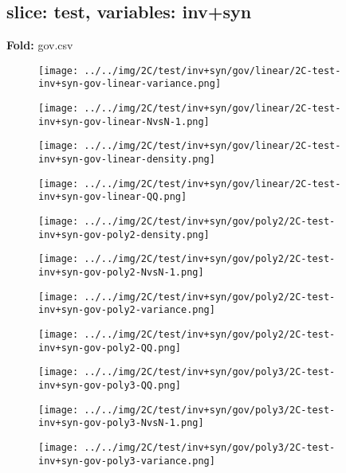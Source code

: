 \subsection{slice: test, variables: inv+syn}
\textbf{Fold:} gov.csv
\begin{figure}[H]
\centering	\texttt{[image: ../../img/2C/test/inv+syn/gov/linear/2C-test-inv+syn-gov-linear-variance.png]}
\end{figure}
\begin{figure}[H]
\centering	\texttt{[image: ../../img/2C/test/inv+syn/gov/linear/2C-test-inv+syn-gov-linear-NvsN-1.png]}
\end{figure}
\begin{figure}[H]
\centering	\texttt{[image: ../../img/2C/test/inv+syn/gov/linear/2C-test-inv+syn-gov-linear-density.png]}
\end{figure}
\begin{figure}[H]
\centering	\texttt{[image: ../../img/2C/test/inv+syn/gov/linear/2C-test-inv+syn-gov-linear-QQ.png]}
\end{figure}
\begin{figure}[H]
\centering	\texttt{[image: ../../img/2C/test/inv+syn/gov/poly2/2C-test-inv+syn-gov-poly2-density.png]}
\end{figure}
\begin{figure}[H]
\centering	\texttt{[image: ../../img/2C/test/inv+syn/gov/poly2/2C-test-inv+syn-gov-poly2-NvsN-1.png]}
\end{figure}
\begin{figure}[H]
\centering	\texttt{[image: ../../img/2C/test/inv+syn/gov/poly2/2C-test-inv+syn-gov-poly2-variance.png]}
\end{figure}
\begin{figure}[H]
\centering	\texttt{[image: ../../img/2C/test/inv+syn/gov/poly2/2C-test-inv+syn-gov-poly2-QQ.png]}
\end{figure}
\begin{figure}[H]
\centering	\texttt{[image: ../../img/2C/test/inv+syn/gov/poly3/2C-test-inv+syn-gov-poly3-QQ.png]}
\end{figure}
\begin{figure}[H]
\centering	\texttt{[image: ../../img/2C/test/inv+syn/gov/poly3/2C-test-inv+syn-gov-poly3-NvsN-1.png]}
\end{figure}
\begin{figure}[H]
\centering	\texttt{[image: ../../img/2C/test/inv+syn/gov/poly3/2C-test-inv+syn-gov-poly3-variance.png]}
\end{figure}
